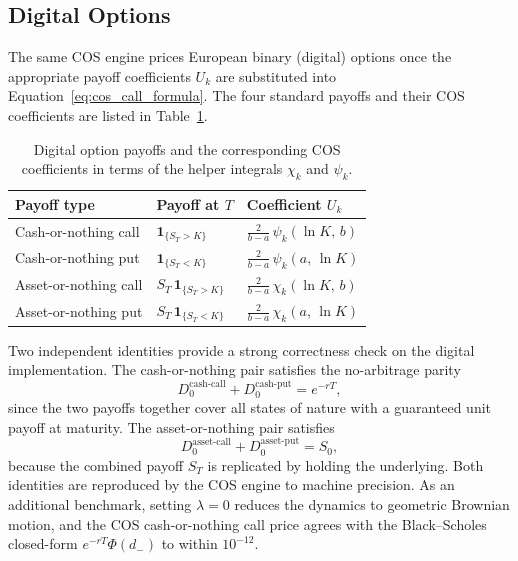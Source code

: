 \documentclass[12pt]{article}
\begin{document}
\subsection*{Digital Options}

The same COS engine prices European binary (digital) options once the
appropriate payoff coefficients $U_k$ are substituted into
Equation~\eqref{eq:cos_call_formula}. The four standard payoffs and
their COS coefficients are listed in Table~\ref{tab:cos_digital}.

\begin{table}[ht]
  \centering
  \caption{Digital option payoffs and the corresponding COS
    coefficients in terms of the helper integrals
    $\chi_k$ and $\psi_k$.}
  \label{tab:cos_digital}
  \begin{tabular}{lll}
    \toprule
    \textbf{Payoff type} & \textbf{Payoff at $T$} & \textbf{Coefficient $U_k$}\\
    \midrule
    Cash-or-nothing call  & $\mathbf{1}_{\{S_T > K\}}$
        & $\tfrac{2}{b-a}\,\psi_k(\ln K,\,b)$\\
    Cash-or-nothing put   & $\mathbf{1}_{\{S_T < K\}}$
        & $\tfrac{2}{b-a}\,\psi_k(a,\,\ln K)$\\
    Asset-or-nothing call & $S_T\,\mathbf{1}_{\{S_T > K\}}$
        & $\tfrac{2}{b-a}\,\chi_k(\ln K,\,b)$\\
    Asset-or-nothing put  & $S_T\,\mathbf{1}_{\{S_T < K\}}$
        & $\tfrac{2}{b-a}\,\chi_k(a,\,\ln K)$\\
    \bottomrule
  \end{tabular}
\end{table}

Two independent identities provide a strong correctness check on the
digital implementation. The cash-or-nothing pair satisfies the
no-arbitrage parity
\begin{equation}
  D^{\text{cash-call}}_0 + D^{\text{cash-put}}_0 = e^{-rT},
  \label{eq:digital_parity}
\end{equation}
since the two payoffs together cover all states of nature with a
guaranteed unit payoff at maturity. The asset-or-nothing pair
satisfies
\begin{equation}
  D^{\text{asset-call}}_0 + D^{\text{asset-put}}_0 = S_0,
\end{equation}
because the combined payoff $S_T$ is replicated by holding the
underlying. Both identities are reproduced by the COS engine to
machine precision. As an additional benchmark, setting $\lambda = 0$
reduces the dynamics to geometric Brownian motion, and the COS
cash-or-nothing call price agrees with the Black--Scholes closed-form
$e^{-rT}\Phi(d_-)$ to within $10^{-12}$.
\end{document}
